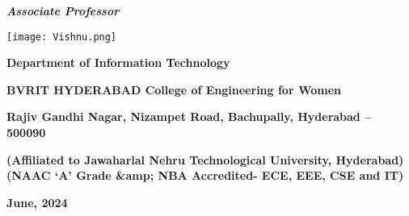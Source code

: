 \documentclass[12pt, English]{article}
\begin{document}
\begin{titlepage}
\begin{center}
\textbf{\large \textit {Associate Professor}}\\
\begin{center}
\texttt{[image: Vishnu.png]}
\end{center}
\begin{large}
\textbf{Department of Information Technology}\\
\end{large}
\begin{Large}
\textbf{BVRIT HYDERABAD College of Engineering for Women}\\
\end{Large}
\begin{normalsize}
\textbf{ Rajiv Gandhi Nagar, Nizampet Road, Bachupally, Hyderabad – 500090}

\textbf{(Affiliated to Jawaharlal Nehru Technological University, Hyderabad)}\\

\textbf{(NAAC ‘A’ Grade \&amp; NBA Accredited- ECE, EEE, CSE and IT)}\\

\end{normalsize}
\begin{large}
\vspace{0.01in}
\textbf{ June, 2024}\\
\end{large}
\end{center}
\end{titlepage}
\end{document}
